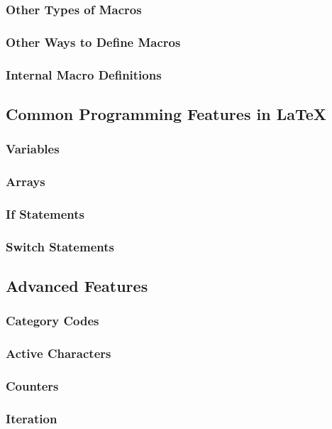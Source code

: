 \subsubsection{Other Types of Macros}
\subsubsection{Other Ways to Define Macros} \label{section:programming/macros/otherWays}
\subsubsection{Internal Macro Definitions}

\subsection{Common Programming Features in LaTeX}
\subsubsection{Variables}
\subsubsection{Arrays}
\subsubsection{If Statements}
\subsubsection{Switch Statements}


\subsection{Advanced Features} \label{section:programming/advancedFeatures}
\subsubsection{Category Codes}
\subsubsection{Active Characters}
\subsubsection{Counters}
\subsubsection{Iteration}
